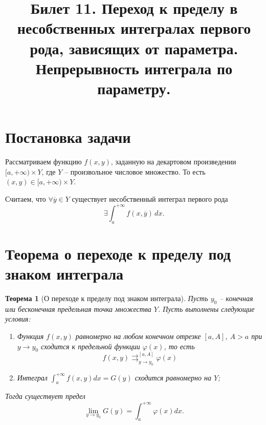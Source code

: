 \documentclass{article}
\title{Билет 11. Переход к пределу в несобственных интегралах первого рода, зависящих от параметра. Непрерывность интеграла по параметру.}
\author{}
\date{}
\theoremstyle{plain}
\newtheorem{theorem}{Теорема}
\theoremstyle{definition}
\theoremstyle{remark}
\begin{document}
\maketitle

\section*{Постановка задачи}

Рассматриваем функцию $f(x, y)$, заданную на декартовом произведении $[a, +\infty) \times Y$, где $Y$ -- произвольное числовое множество. То есть $(x, y) \in [a, +\infty) \times Y$.

Считаем, что $\forall \overline{y} \in Y$ существует несобственный интеграл первого рода
\[
\exists\int_{a}^{+\infty} f(x, \overline{y}) \, dx.
\]

\section*{Теорема о переходе к пределу под знаком интеграла}

\begin{theorem}[О переходе к пределу под знаком интеграла]
Пусть $y_0$ -- конечная или бесконечная предельная точка множества $Y$. Пусть выполнены следующие условия:
\begin{enumerate}
    \item Функция $f(x, y)$ равномерно на любом конечном отрезке $[a, A]$, $A > a$ при $y \to y_0$ сходится к предельной функции $\varphi(x)$, то есть
    \[
    f(x, y)\rightrightarrows^{[a, A]}_{y \to y_0} \varphi(x)
    \]
    \item Интеграл $\int_{a}^{+\infty} f(x, y)dx = G(y)$ сходится равномерно на $Y$;
\end{enumerate}
Тогда существует предел
\[
\lim_{y \to y_0} G(y) = \int_{a}^{+\infty} \varphi(x)dx.
\]
\end{theorem}
\end{document}

